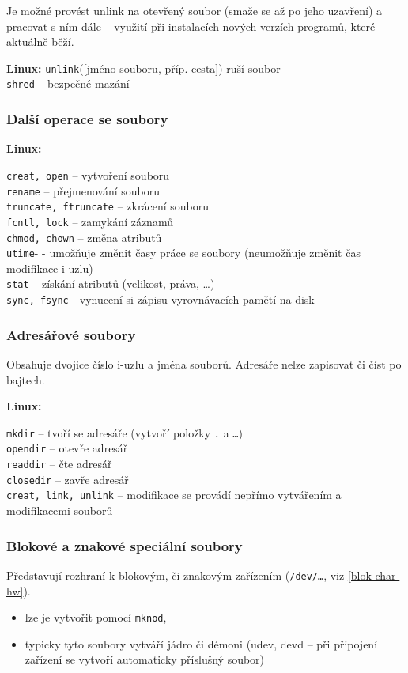 \documentclass[a4paper, 11pt]{article}
\newcommand{\tcmd}[1]{\texttt{#1}}
\newcommand{\lpath}[1]{\texttt{#1}}
\begin{document}
Je možné provést unlink na otevřený soubor (smaže se až po jeho uzavření) a pracovat s ním dále -- využití při instalacích nových verzích programů, které aktuálně běží.
 
\textbf{Linux:}
\tcmd{unlink}([jméno souboru, příp. cesta]) ruší soubor \\[0.2em]
\tcmd{shred} -- bezpečné mazání

\subsubsection{Další operace se soubory}

\textbf{Linux:}

\tcmd{creat, open} -- vytvoření souboru \\[0.2em]
\tcmd{rename} -- přejmenování souboru \\[0.2em]
\tcmd{truncate, ftruncate} -- zkrácení souboru \\[0.2em]
\tcmd{fcntl, lock} -- zamykání záznamů \\[0.2em]
\tcmd{chmod, chown} -- změna atributů \\[0.2em]
\tcmd{utime}- - umožňuje změnit časy práce se soubory (neumožňuje změnit čas modifikace i-uzlu) \\[0.2em]
\tcmd{stat} -- získání atributů (velikost, práva, \ldots) \\[0.2em]
\tcmd{sync, fsync} - vynucení si zápisu vyrovnávacích pamětí na disk

\subsubsection{Adresářové soubory}
Obsahuje dvojice číslo i-uzlu a jména souborů. Adresáře nelze zapisovat či číst po bajtech.

\textbf{Linux:}

\tcmd{mkdir} -- tvoří se adresáře (vytvoří položky \lpath{.} a \lpath{\ldots}) \\[0.2em]
\tcmd{opendir} -- otevře adresář \\[0.2em]
\tcmd{readdir} -- čte adresář \\[0.2em]
\tcmd{closedir} -- zavře adresář \\[0.2em]
\tcmd{creat, link, unlink} -- modifikace se provádí nepřímo vytvářením a modifikacemi souborů

\subsubsection{Blokové a znakové speciální soubory}
Představují rozhraní k blokovým, či znakovým zařízením (\lpath{/dev/\ldots}, viz \ref{blok-char-hw}).
\begin{itemize}
\item lze je vytvořit pomocí \tcmd{mknod},
\item typicky tyto soubory vytváří jádro či démoni (udev, devd -- při připojení zařízení se vytvoří automaticky příslušný soubor)
\end{itemize}
\end{document}
